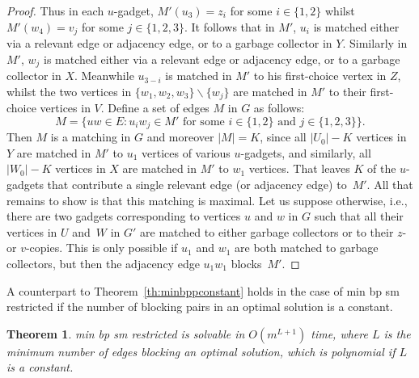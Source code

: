 \documentclass[preprint,12pt]{elsarticle}
\newtheorem{theorem}{Theorem}[section]
\begin{document}
\begin{proof}
    Thus in each $u$-gadget, $M'(u_3)=z_i$ for some $i\in \{1,2\}$ whilst $M'(w_4)=v_j$ for some $j\in \{1,2,3\}$.  It follows that in $M'$, $u_i$ is matched either via a relevant edge or adjacency edge, or to a garbage collector in $Y$.  Similarly in $M'$, $w_j$ is matched either via a relevant edge or adjacency edge, or to a garbage collector in $X$.  Meanwhile $u_{3-i}$ is matched in $M'$ to his first-choice vertex in $Z$, whilst the two vertices in $\{w_1,w_2,w_3\}\backslash \{w_j\}$ are matched in $M'$ to their first-choice vertices in $V$.  Define a set of edges $M$ in $G$ as follows:
\[M=\{uw\in E: u_iw_j\in M'\mbox{ for some $i\in \{1,2\}$ and $j\in \{1,2,3\}$}\}.\]
Then $M$ is a matching in $G$ and moreover $|M|=K$, since all $|U_0| - K$ vertices in $Y$ are matched in $M'$ to $u_1$ vertices of various $u$-gadgets, and similarly, all $|W_0| - K$ vertices in $X$ are matched in $M'$ to $w_1$ vertices. That leaves $K$ of the $u$-gadgets that contribute a single relevant edge (or adjacency edge) to~$M'$. All that remains to show is that this matching is maximal. Let us suppose otherwise, i.e., there are two gadgets corresponding to vertices $u$ and $w$ in $G$ such that all their vertices in $U$ and~$W$ in $G'$ are matched to either garbage collectors or to their $z$- or $v$-copies. This is only possible if $u_1$ and $w_1$ are both matched to garbage collectors, but then the adjacency edge $u_1w_1$ blocks~$M'$.
\end{proof}

A counterpart to Theorem~\ref{th:minbppconstant} holds in the case of {\sc min bp sm restricted} if the number of blocking pairs in an optimal solution is a constant.

\begin{theorem}
\label{th:minbpbpconstant}
	{\sc min bp sm restricted} is solvable in $O(m^{L+1})$ time, where $L$ is the minimum number of edges blocking an optimal solution, which is polynomial if $L$ is a constant.
\end{theorem}
\end{document}
